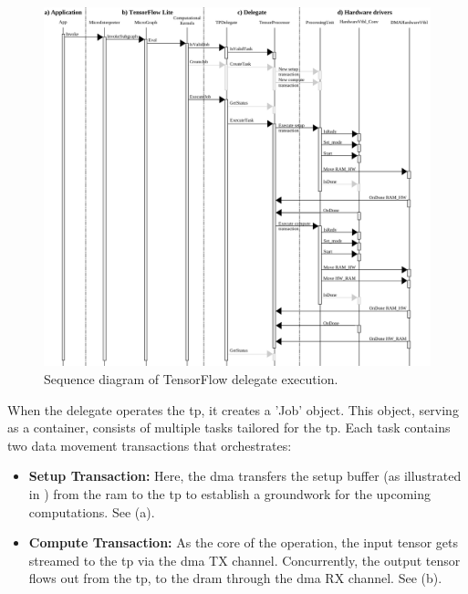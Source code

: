 \begin{figure}[h!]
	\centering
	\includegraphics[width=\textwidth]{./figures/sequence_tfl_delegate_acceleration.pdf}
	\caption{Sequence diagram of TensorFlow delegate execution.}
	\label{fig:sw_tf_delegate_execution}
\end{figure}

When the delegate operates the \gls{tp}, it creates a 'Job' object. This object, serving as a container, consists of multiple tasks tailored for the \gls{tp}. Each task contains two data movement transactions that orchestrates:

\begin{itemize}
	\item \textbf{Setup Transaction:} Here, the \gls{dma} transfers the setup buffer (as illustrated in ) from the \gls{ram} to the \gls{tp} to establish a groundwork for the upcoming computations. See  (a).
	\item \textbf{Compute Transaction:} As the core of the operation, the input tensor gets streamed to the \gls{tp} via the \gls{dma} TX channel. Concurrently, the output tensor flows out from the \gls{tp}, to the \gls{dram} through the \gls{dma} RX channel. See  (b).
\end{itemize}

